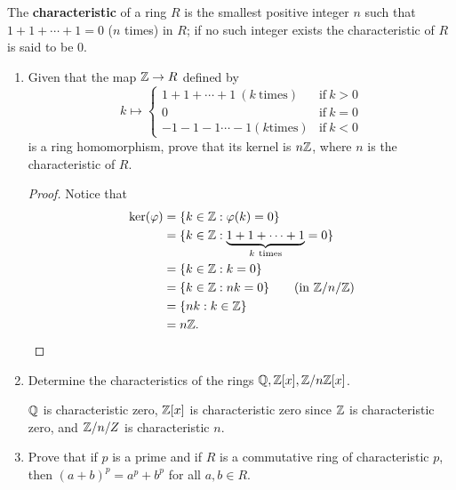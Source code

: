 \documentclass[a4paper]{article}
\begin{document}
\begin{problem}
   The \textbf{characteristic} of a ring \( R  \) is the smallest positive integer \( n  \) such that \( 1 + 1 + \cdots + 1 = 0  \) (\( n  \) times) in \( R  \); if no such integer exists the characteristic of \( R  \) is said to be \( 0  \). 
   \begin{enumerate}
       \item[(a)] Given that the map \( \mathbb{Z} \to R  \) defined by
           \[  k \longmapsto 
           \begin{cases}
               1 + 1 + \cdots + 1 \ (k \ \text{times}) &\text{if} \ k > 0 \\ 
               0 &\text{if} \ k = 0 \\
               -1 -1 - 1 \cdots - 1 (k \text{times}) &\text{if} \ k < 0 
           \end{cases}  \]
           is a ring homomorphism, prove that its kernel is \( n \mathbb{Z}  \), where \( n \) is the characteristic of \( R  \).
           \begin{proof}
               Notice that 
           \begin{align*}
               \text{ker}(\varphi) &= \{ k \in \Z : \varphi(k) = 0  \}  \\
                                   &= \{ k \in \Z : \underbrace{1 + 1 + \cdots + 1}_{k \ \text{times}}  = 0  \}  \\
                                   &= \{ k \in \Z : k = 0  \}  \\
                                   &= \{ k \in \Z : n k  = 0  \} \tag{in \( \Z / n /\Z  \)}  \\
                                   &= \{ nk : k \in \Z  \}  \\
                                   &= n \Z.
           \end{align*}
           \end{proof}
       \item[(b)] Determine the characteristics of the rings \( \mathbb{Q} , \mathbb{Z}[x], \mathbb{Z}/ n \mathbb{Z} [x] \).
           \begin{solution}
            \( \mathbb{Q}  \) is characteristic zero, \( \mathbb{Z}[x]  \) is characteristic zero since \( \mathbb{Z}  \) is characteristic zero, and \( \mathbb{Z} / n /Z  \) is characteristic \( n  \).
           \end{solution}
        \item[(c)] Prove that if \( p  \) is a prime and if \( R  \) is a commutative ring of characteristic \( p  \), then \( (a+b)^{p} = a^{p} + b^{p} \) for all \( a,b \in R  \).

\end{enumerate}
\end{problem}
\end{document}
